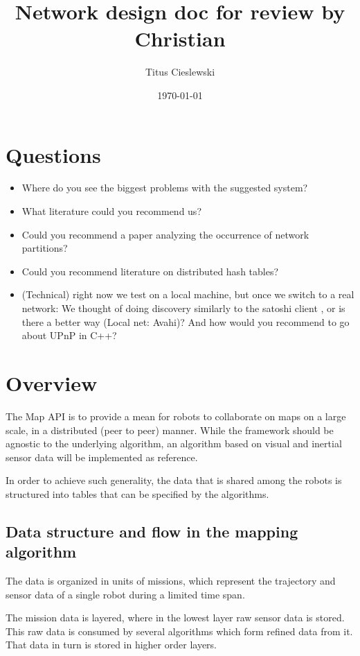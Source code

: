 \documentclass[a4paper, 10pt, conference]{ieeeconf}
\title{Network design doc for review by Christian}
\author{Titus Cieslewski}
\date{\today}
\begin{document}
\maketitle

\section{Questions}

\begin{itemize}
  \itemsep0em
  \item Where do you see the biggest problems with the suggested system?
  \item What literature could you recommend us?
  \item Could you recommend a paper analyzing the occurrence of network
    partitions?
  \item Could you recommend literature on distributed hash tables?
  \item (Technical) right now we test on a local machine, but once we switch to
    a real network: We thought of doing discovery similarly to the satoshi
    client \cite{discovery}, or is there a better way (Local net: Avahi)? 
    And how would you recommend to go about UPnP in C++?
\end{itemize}

\section{Overview}

The Map API is to provide a mean for robots to collaborate on maps on a large
scale, in a distributed (peer to peer) manner. While the framework should be
agnostic to the underlying algorithm, an algorithm based on visual and inertial
sensor data will be implemented as reference.

In order to achieve such generality, the data that is shared among the robots is
structured into tables that can be specified by the algorithms.

\subsection{Data structure and flow in the mapping algorithm}

The data is organized in units of missions, which represent the trajectory and
sensor data of a single robot during a limited time span.

The mission data is layered, where in the lowest layer raw sensor data is
stored. This raw data is consumed by several algorithms which form refined data
from it. That data in turn is stored in higher order layers.
\end{document}
